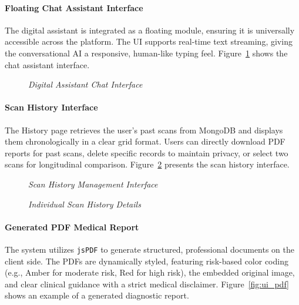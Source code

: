 \paragraph{Floating Chat Assistant Interface}
The digital assistant is integrated as a floating module, ensuring it is universally accessible across the platform. The UI supports real-time text streaming, giving the conversational AI a responsive, human-like typing feel. Figure~\ref{fig:ui_chat} shows the chat assistant interface.

\begin{figure}[H]
	\centering
	\caption{\textit{Digital Assistant Chat Interface}}
	\label{fig:ui_chat}
\end{figure}

\paragraph{Scan History Interface}
The History page retrieves the user's past scans from MongoDB and displays them chronologically in a clear grid format. Users can directly download PDF reports for past scans, delete specific records to maintain privacy, or select two scans for longitudinal comparison. Figure~\ref{fig:ui_history} presents the scan history interface.

\begin{figure}[H]
	\centering
	\caption{\textit{Scan History Management Interface}}
	\label{fig:ui_history}
\end{figure}

\begin{figure}[H]
	\centering
	\caption{\textit{Individual Scan History Details}}
	\label{fig:ui_history_singular}
\end{figure}

\paragraph{Generated PDF Medical Report}
The system utilizes \texttt{jsPDF} to generate structured, professional documents on the client side. The PDFs are dynamically styled, featuring risk-based color coding (e.g., Amber for moderate risk, Red for high risk), the embedded original image, and clear clinical guidance with a strict medical disclaimer. Figure~\ref{fig:ui_pdf} shows an example of a generated diagnostic report.

